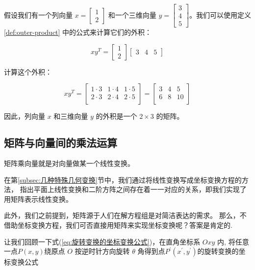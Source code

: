 \begin{exercise}
    假设我们有一个列向量 $x = \begin{bmatrix} 1 \\ 2 \end{bmatrix}$ 和一个三维向量 $y = \begin{bmatrix} 3 \\ 4 \\ 5 \end{bmatrix}$。我们可以使用定义 \ref{def:outer-product} 中的公式来计算它们的外积：

\[
x y^T = \begin{bmatrix} 1 \\ 2 \end{bmatrix} \begin{bmatrix} 3 & 4 & 5 \end{bmatrix}
\]

计算这个外积：

\[
x y^T = \begin{bmatrix}
1 \cdot 3 & 1 \cdot 4 & 1 \cdot 5 \\
2 \cdot 3 & 2 \cdot 4 & 2 \cdot 5 \\
\end{bmatrix} = \begin{bmatrix}
3 & 4 & 5 \\
6 & 8 & 10 \\
\end{bmatrix}
\]

因此，列向量 $x$ 和三维向量 $y$ 的外积是一个 $2 \times 3$ 的矩阵。
\end{exercise}


\subsection{矩阵与向量间的乘法运算}

\begin{note}
    矩阵乘向量就是对向量做某一个线性变换。
\end{note}

\vspace{0.3cm}

在第\ref{subsec:几种特殊几何变换}节中，我们通过将线性变换写成坐标变换方程的方法，
指出平面上线性变换和二阶方阵之间存在着一一对应的关系，即我们实现了用矩阵表示线性变换。

此外，我们之前提到，矩阵源于人们在解方程组是对简洁表达的需求。
那么，不借助坐标变换方程，我们可否直接用矩阵来实现坐标变换呢？答案是肯定的.

让我们回顾一下式(\ref{eq:旋转变换的坐标变换公式})，在直角坐标系 $O x y$ 内, 
将任意一点$P(x, y)$绕原点 $O$ 按逆时针方向旋转 $\theta$ 角得到点$P^{\prime}(x^{\prime}, y^{\prime})$的旋转变换的坐标变换公式

